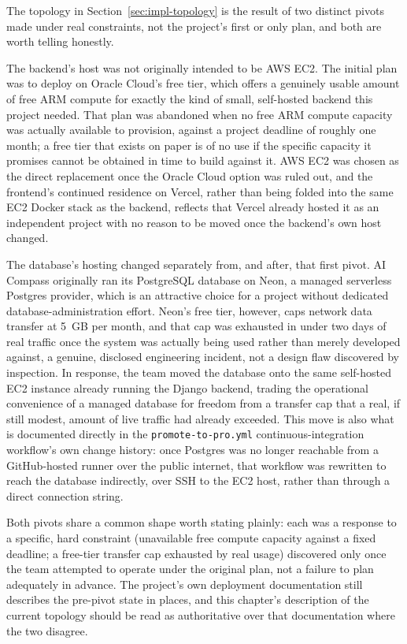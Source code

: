 The topology in Section~\ref{sec:impl-topology} is the result of two distinct pivots made under real constraints, not the project's first or only plan, and both are worth telling honestly.

The backend's host was not originally intended to be AWS EC2. The initial plan was to deploy on Oracle Cloud's free tier, which offers a genuinely usable amount of free ARM compute for exactly the kind of small, self-hosted backend this project needed. That plan was abandoned when no free ARM compute capacity was actually available to provision, against a project deadline of roughly one month; a free tier that exists on paper is of no use if the specific capacity it promises cannot be obtained in time to build against it. AWS EC2 was chosen as the direct replacement once the Oracle Cloud option was ruled out, and the frontend's continued residence on Vercel, rather than being folded into the same EC2 Docker stack as the backend, reflects that Vercel already hosted it as an independent project with no reason to be moved once the backend's own host changed.

The database's hosting changed separately from, and after, that first pivot. AI Compass originally ran its PostgreSQL database on Neon, a managed serverless Postgres provider, which is an attractive choice for a project without dedicated database-administration effort. Neon's free tier, however, caps network data transfer at 5~GB per month, and that cap was exhausted in under two days of real traffic once the system was actually being used rather than merely developed against, a genuine, disclosed engineering incident, not a design flaw discovered by inspection. In response, the team moved the database onto the same self-hosted EC2 instance already running the Django backend, trading the operational convenience of a managed database for freedom from a transfer cap that a real, if still modest, amount of live traffic had already exceeded. This move is also what is documented directly in the \texttt{promote-to-pro.yml} continuous-integration workflow's own change history: once Postgres was no longer reachable from a GitHub-hosted runner over the public internet, that workflow was rewritten to reach the database indirectly, over SSH to the EC2 host, rather than through a direct connection string.

Both pivots share a common shape worth stating plainly: each was a response to a specific, hard constraint (unavailable free compute capacity against a fixed deadline; a free-tier transfer cap exhausted by real usage) discovered only once the team attempted to operate under the original plan, not a failure to plan adequately in advance. The project's own deployment documentation still describes the pre-pivot state in places, and this chapter's description of the current topology should be read as authoritative over that documentation where the two disagree.

